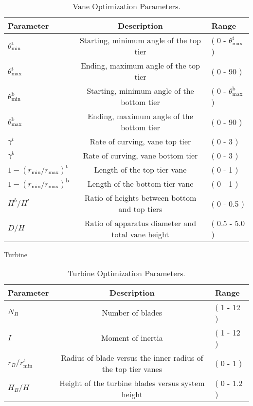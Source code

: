 %
%
\large
\begin{center}
\begin{table}[h]
 \centering
  \begin{tabular}{| l | c | l |}
    \hline
    Parameter & Description & Range \\
    \hline
    $\theta^{\text{t}}_{\text{min}}$ & Starting, minimum angle of the
       top tier & ( 0 - $\theta^{\text{t}}_{\text{max}}$ ) \\
    $\theta^{\text{t}}_{\text{max}}$ & Ending, maximum angle of the top
       tier & ( 0 - 90 ) \\
    $\theta^{\text{b}}_{\text{min}}$ & Starting, minimum angle of the
       bottom tier & ( 0 - $\theta^{\text{b}}_{\text{max}}$ ) \\
    $\theta^{\text{b}}_{\text{max}}$ & Ending, maximum angle of the
       bottom tier & ( 0 - 90 ) \\
   $\gamma^t$ & Rate of curving, vane top tier & ( 0 - 3 ) \\
   $\gamma^b$ & Rate of curving, vane bottom tier & ( 0 - 3 ) \\
   $1 - (r_{\text{min}} / r_{\text{max}})^{\text{t}}$ & Length of the top
       tier vane & ( 0 - 1 ) \\
   $1 - (r_{\text{min}} / r_{\text{max}})^{\text{b}}$ & Length of the
       bottom 
       tier vane & ( 0 - 1 ) \\
   $H^b/H^t$ & Ratio of heights between bottom and top tiers & ( 0 -
	   0.5 ) \\ 
   $D/H$ & Ratio of apparatus diameter and total vane height & ( 0.5 -
	   5.0 ) \\ 
    \hline
  \end{tabular}
  \caption{Vane Optimization Parameters.}
  \label{tab:vane}
\end{table}
\end{center}
\normalsize

Turbine

%
%
\large
\begin{center}
\begin{table}[h]
 \centering
  \begin{tabular}{| l | c | l |}
    \hline
    Parameter & Description & Range \\
    \hline
    $N_B$ & Number of blades & ( 1 - 12 ) \\
    $I$ & Moment of inertia & ( 1 - 12 ) \\
    $r_B/r_{\text{min}}^t$ & Radius of blade versus the inner radius of
       the top tier vanes & ( 0 - 1 ) \\
   $H_B/H$ & Height of the turbine blades versus system height & ( 0 - 1.2 ) \\
    \hline
  \end{tabular}
  \caption{Turbine Optimization Parameters.}
  \label{tab:turbine}
\end{table}
\end{center}
\normalsize

